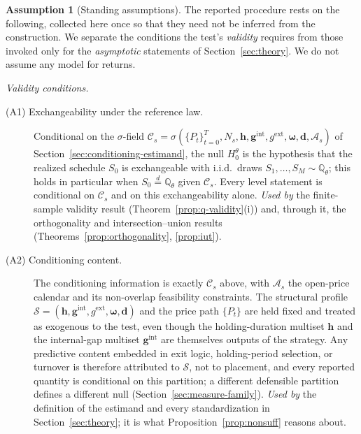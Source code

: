 \documentclass[preprint,12pt]{elsarticle}
\theoremstyle{definition}
\newtheorem{assumption}{Assumption}
\begin{document}
\begin{assumption}[Standing assumptions]
\label{ass:standing}
The reported procedure rests on the following, collected here once so that
they need not be inferred from the construction. We separate the conditions
the test's \emph{validity} requires from those invoked only for the
\emph{asymptotic} statements of Section~\ref{sec:theory}. We do not assume any
model for returns.

\medskip
\noindent\emph{Validity conditions.}

\begin{description}
\item[(A1) Exchangeability under the reference law.] Conditional on the
$\sigma$-field $\mathcal C_s=\sigma(\{P_t\}_{t=0}^{T},\allowbreak N_s,\allowbreak\mathbf h,
\allowbreak\mathbf g^{\mathrm{int}},\allowbreak g^{\mathrm{ext}},\allowbreak\boldsymbol\omega,\allowbreak\mathbf d,
\allowbreak\mathcal A_s)$ of Section~\ref{sec:conditioning-estimand}, the null
$H_0^\theta$ is the hypothesis that the realized schedule $S_0$ is
exchangeable with i.i.d.\ draws $S_1,\dots,S_M\sim\mathbb{Q}_\theta$; this
holds in particular when $S_0\stackrel{d}{=}\mathbb{Q}_\theta$ given
$\mathcal C_s$. Every level statement is conditional on $\mathcal C_s$ and on
this exchangeability alone. \emph{Used by} the finite-sample validity result
(Theorem~\ref{prop:q-validity}(i)) and, through it, the orthogonality and
intersection--union results (Theorems~\ref{prop:orthogonality},
\ref{prop:iut}).

\item[(A2) Conditioning content.] The conditioning information is exactly
$\mathcal C_s$ above, with $\mathcal A_s$ the open-price calendar and its
non-overlap feasibility constraints. The structural profile
$\mathcal S=(\mathbf h,\mathbf g^{\mathrm{int}},g^{\mathrm{ext}},
\boldsymbol\omega,\mathbf d)$ and the price path $\{P_t\}$ are held fixed and
treated as exogenous to the test, even though the holding-duration multiset
$\mathbf h$ and the internal-gap multiset $\mathbf g^{\mathrm{int}}$ are
themselves outputs of the strategy. Any predictive content embedded in exit
logic, holding-period selection, or turnover is therefore attributed to
$\mathcal S$, not to placement, and every reported quantity is conditional on
this partition; a different defensible partition defines a different null
(Section~\ref{sec:measure-family}). \emph{Used by} the definition of the
estimand and every standardization in Section~\ref{sec:theory}; it is what
Proposition~\ref{prop:nonsuff} reasons about.


\end{description}
\end{assumption}
\end{document}
